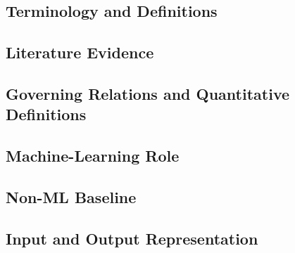 \subsection{Terminology and Definitions}
\label{sec:res-ml-dat-definitions}


\subsection{Literature Evidence}
\label{sec:res-ml-dat-literature-evidence}

%

\subsection{Governing Relations and Quantitative Definitions}
\label{sec:res-ml-dat-governing-relations}

%

\subsection{Machine-Learning Role}
\label{sec:res-ml-dat-machine-learning-role}


\subsection{Non-ML Baseline}
\label{sec:res-ml-dat-non-ml-baseline}


\subsection{Input and Output Representation}
\label{sec:res-ml-dat-input-output-representation}

